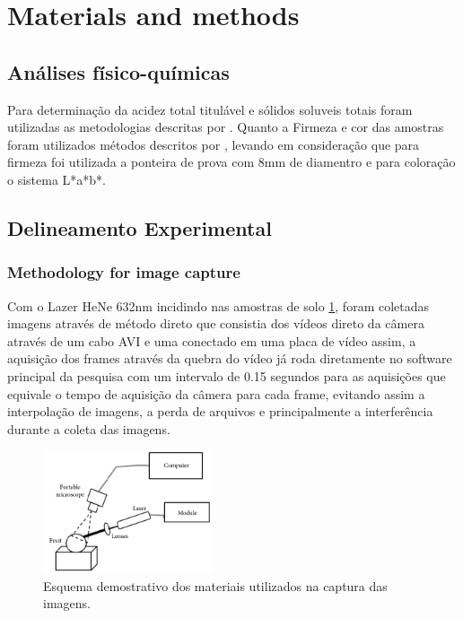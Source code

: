 \documentclass{elsarticle}
\begin{document}
\section{Materials and methods}

\subsection{Análises físico-químicas} 

Para  determinação da acidez total titulável e sólidos soluveis totais foram utilizadas as metodologias descritas por \cite{Dubois}. Quanto a Firmeza e cor das amostras foram utilizados métodos descritos por \citep{Tecnico}, levando em consideração que para firmeza foi utilizada a ponteira de prova com 8mm de diamentro e para coloração o sistema L*a*b*.



\subsection{Delineamento Experimental}

\subsubsection{Methodology for image capture}
Com o Lazer HeNe 632nm incidindo nas amostras de solo \ref{fig:laser}, foram coletadas imagens através de método direto que consistia dos vídeos  direto da câmera através de um cabo AVI e uma conectado em uma placa de vídeo assim, a aquisição dos frames através da quebra do vídeo já roda diretamente no software principal da pesquisa com um intervalo de 0.15 segundos para as aquisições que equivale o tempo de aquisição da câmera para cada frame, evitando assim a interpolação de imagens, a perda de arquivos e principalmente a interferência durante a coleta das imagens.

\begin{figure}[!htb]
\centering
\includegraphics[width=5cm]{figure/materiais/setup.jpg}
\caption{Esquema demostrativo dos materiais utilizados na captura das imagens.}
\label{fig:laser}
\end{figure}
\end{document}
